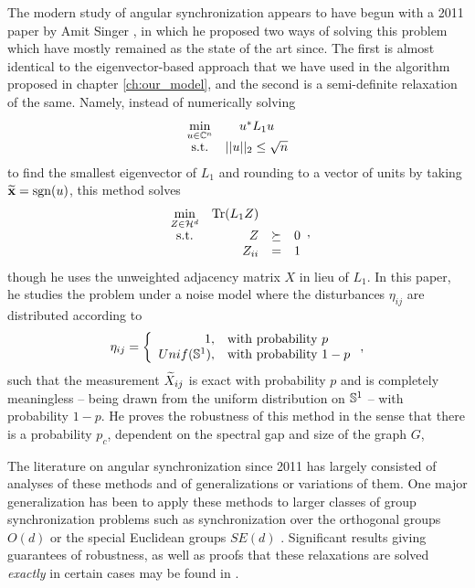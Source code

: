 The modern study of angular synchronization appears to have begun with a 2011 paper by Amit Singer \cite{singer2011ang_sync}, in which he proposed two ways of solving this problem which have mostly remained as the state of the art since.  The first is almost identical to the eigenvector-based approach that we have used in the algorithm proposed in chapter \ref{ch:our_model}, and the second is a semi-definite relaxation of the same.  Namely, instead of numerically solving \[\begin{array}{cc} \min\limits_{u \in \mathbb{C}^n} & u^* L_1 u \\ \text{s.t.} & ||u||_2 \le \sqrt{n} \end{array} \label{eq:angsyncSDPsinger}\] to find the smallest eigenvector of $L_1$ and rounding to a vector of units by taking $\widetilde{\mathbf{x}} = \operatorname{sgn}(u)$, this method solves \[\begin{array}{crcl} \min\limits_{Z \in \mathcal{H}^d} & \operatorname{Tr}(L_1 Z) \\ \text{s.t.} & Z & \succeq & 0 \\ & Z_{ii} & = & 1 \end{array},\] though he uses the unweighted adjacency matrix $X$ in lieu of $L_1$.  In this paper, he studies the problem under a noise model where the disturbances $\eta_{ij}$ are distributed according to \[\eta_{ij} = \left\{\begin{array}{r@{,\quad}l} 1 & \text{with probability}\ p \\ \mathop{Unif}(\Sbb^1) & \text{with probability}\ 1 - p\end{array}\right.,\] such that the measurement $\widetilde{X}_{ij}$ is exact with probability $p$ and is completely meaningless -- being drawn from the uniform distribution on $\mathbb{S}^1$ -- with probability $1 - p$.  He proves the robustness of this method in the sense that there is a probability $p_c$, dependent on the spectral gap and size of the graph $G$, 

The literature on angular synchronization since 2011 has largely consisted of analyses of these methods and of generalizations or variations of them.  One major generalization has been to apply these methods to larger classes of group synchronization problems such as synchronization over the orthogonal groups $O(d)$ or the special Euclidean groups $SE(d)$ \cite{Cheeger,briales2017cartan_sync,bandeira2016se_sync}.  Significant results giving guarantees of robustness, as well as proofs that these relaxations are solved \emph{exactly} in certain cases may be found in \cite{alexeev2014phase, bandeira2016tightness, olsson2017rot_avg, bandeira2016se_sync}.


